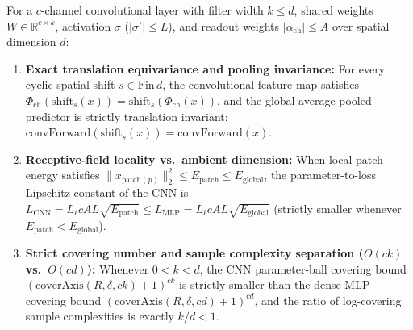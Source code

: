 \begin{lemma}\label{lem:convolutional_generalization}
\leanok
{}
For a $c$-channel convolutional layer with filter width $k \le d$, shared weights $W\in\mathbb{R}^{c\times k}$, activation $\sigma$ ($|\sigma'|\le L$), and readout weights $|\alpha_{\mathrm{ch}}|\le A$ over spatial dimension $d$:
\begin{enumerate}
\item \textbf{Exact translation equivariance and pooling invariance:} For every cyclic spatial shift $s\in\mathrm{Fin}\,d$, the convolutional feature map satisfies $\Phi_{\mathrm{ch}}(\mathrm{shift}_s(x)) = \mathrm{shift}_s(\Phi_{\mathrm{ch}}(x))$, and the global average-pooled predictor is strictly translation invariant: $\mathrm{convForward}(\mathrm{shift}_s(x)) = \mathrm{convForward}(x)$.
\item \textbf{Receptive-field locality vs.\ ambient dimension:} When local patch energy satisfies $\|x_{\mathrm{patch}(p)}\|_2^2 \le E_{\mathrm{patch}} \le E_{\mathrm{global}}$, the parameter-to-loss Lipschitz constant of the CNN is $L_{\mathrm{CNN}} = L_\ell c A L\sqrt{E_{\mathrm{patch}}} \le L_{\mathrm{MLP}} = L_\ell c A L\sqrt{E_{\mathrm{global}}}$ (strictly smaller whenever $E_{\mathrm{patch}} < E_{\mathrm{global}}$).
\item \textbf{Strict covering number and sample complexity separation ($O(ck)$ vs.\ $O(cd)$):} Whenever $0 < k < d$, the CNN parameter-ball covering bound $(\mathrm{coverAxis}(R,\delta,ck)+1)^{ck}$ is strictly smaller than the dense MLP covering bound $(\mathrm{coverAxis}(R,\delta,cd)+1)^{cd}$, and the ratio of log-covering sample complexities is exactly $k/d < 1$.
\end{enumerate}
\end{lemma}
